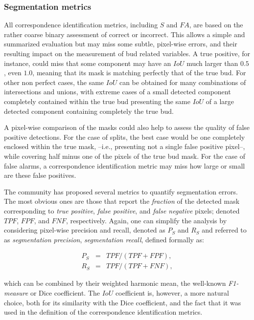 \documentclass[a4paper,authoryear,review]{elsarticle}
\begin{document}
\subsubsection{Segmentation metrics}
\label{subsec:segmetrics}


All correspondence identification metrics, including $S$ and $FA$, are based on the rather coarse binary assessment of correct or incorrect. This allows a simple and summarized evaluation but may miss some subtle, pixel-wise errors, and their resulting impact on the measurement of bud related variables. 
%
A true positive, for instance, could miss that some component may have an $IoU$ much larger than $0.5$, even $1.0$, meaning that its mask is matching perfectly that of the true bud. 
%
For other non perfect cases, the same $IoU$ can be obtained for many combinations of intersections and unions, with extreme cases of a small detected component completely contained within the true bud presenting the same $IoU$ of a large detected component containing completely the true bud.

A pixel-wise comparison of the masks could also help to assess the quality of false positive detections. For the case of splits, the best case would be one completely enclosed within the true mask, --i.e., presenting not a single false positive pixel--, while covering half minus one of the pixels of the true bud mask. 
%
For the case of false alarms, a correspondence identification metric may miss how large or small are these false positives. 

The community has proposed several metrics to quantify segmentation errors. The most obvious ones are those that report the \emph{fraction} of the detected mask corresponding to \emph{true positive}, \emph{false positive}, and \emph{false negative} pixels; denoted $TPF$, $FPF$, and $FNF$, respectively. Again, one can simplify the analysis by considering pixel-wise precision and recall, denoted as $P_S$ and $R_S$ and referred to as \emph{segmentation precision}, \emph{segmentation recall}, defined formally as: 

\begin{eqnarray*} 
  P_S &=& TPF / (TPF + FPF),\\
  R_S &=& TPF / (TPF + FNF),
\end{eqnarray*}

which can be combined by their weighted harmonic mean, the well-known \emph{F1-measure} or Dice coefficient. The $IoU$ coefficient is, however, a more natural choice, both for its similarity with the Dice coefficient, and the fact that it was used in the definition of the correspondence identification metrics. 
\end{document}
